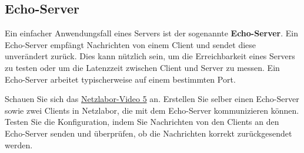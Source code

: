 \subsection{Echo-Server}
Ein einfacher Anwendungsfall eines Servers ist der sogenannte \textbf{Echo-Server}. Ein Echo-Server empfängt Nachrichten von einem Client und sendet diese unverändert zurück. Dies kann nützlich sein, um die Erreichbarkeit eines Servers zu testen oder um die Latenzzeit zwischen Client und Server zu messen. Ein Echo-Server arbeitet typischerweise auf einem bestimmten Port.

\begin{myexercise}\label{ex:filius-echo-server}
	Schauen Sie sich das \href{\netzlaborvideos}{Netzlabor-Video 5} an. Erstellen Sie selber einen Echo-Server sowie zwei Clients in Netzlabor, die mit dem Echo-Server kommunizieren können. Testen Sie die Konfiguration, indem Sie Nachrichten von den Clients an den Echo-Server senden und überprüfen, ob die Nachrichten korrekt zurückgesendet werden.
\end{myexercise}

